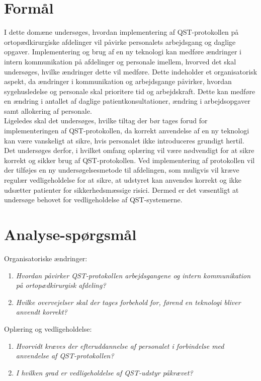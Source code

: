 \section{Formål}
I dette domæne undersøges, hvordan implementering af QST-protokollen på ortopædkirurgiske afdelinger vil påvirke personalets arbejdsgang og daglige opgaver. Implementering og brug af en ny teknologi kan medføre ændringer i intern kommunikation på afdelinger og personale imellem, hvorved det skal undersøges, hvilke ændringer dette vil medføre. Dette indeholder et organisatorisk aspekt, da ændringer i kommunikation og arbejdsgange påvirker, hvordan sygehusledelse og personale skal prioritere tid og arbejdskraft. Dette kan medføre en ændring i antallet af daglige patientkonsultationer, ændring i arbejdsopgaver samt allokering af personale. \\
Ligeledes skal det undersøges, hvilke tiltag der bør tages forud for implementeringen af QST-protokollen, da korrekt anvendelse af en ny teknologi kan være vanskeligt at sikre, hvis personalet ikke introduceres grundigt hertil. Det undersøges derfor, i hvilket omfang oplæring vil være nødvendigt for at sikre korrekt og sikker brug af QST-protokollen. Ved implementering af protokollen vil der tilføjes en ny undersøgelsesmetode til afdelingen, som muligvis vil kræve regulær vedligeholdelse for at sikre, at udstyret kan anvendes korrekt og ikke udsætter patienter for sikkerhedsmæssige risici. Dermed er det væsentligt at undersøge behovet for vedligeholdelse af QST-systemerne.

\section{Analyse-spørgsmål}
Organisatoriske ændringer:
\begin{enumerate}
	\item \textit{Hvordan påvirker QST-protokollen arbejdsgangene og intern kommunikation på ortopædkirurgisk afdeling?} %
	\item \textit{Hvilke overvejelser skal der tages forbehold for, førend en teknologi bliver anvendt korrekt?} %
\end{enumerate}
Oplæring og vedligeholdelse:
\begin{enumerate}[resume]
	\item \textit{Hvorvidt kræves der efteruddannelse af personalet i forbindelse med anvendelse af QST-protokollen?} %
	\item \textit{I hvilken grad er vedligeholdelse af QST-udstyr påkrævet?} %
\end{enumerate}



